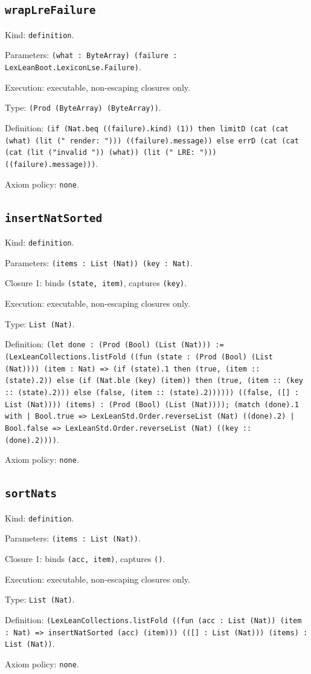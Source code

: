\documentclass[11pt]{article}
\begin{document}
\subsection*{\texttt{wrapLreFailure}}
\noindent Kind: \texttt{definition}.\par
\noindent Parameters: \texttt{(what : ByteArray) (failure : LexLeanBoot.LexiconLse.Failure)}.\par
\noindent Execution: executable, non-escaping closures only.\par
\noindent Type: \texttt{(Prod (ByteArray) (ByteArray))}.\par
\noindent Definition: \texttt{(if (Nat.beq ((failure).kind) (1)) then limitD (cat (cat (what) (lit (" render: "))) ((failure).message)) else errD (cat (cat (cat (lit ("invalid ")) (what)) (lit (" LRE: "))) ((failure).message)))}.\par
\noindent Axiom policy: \texttt{none}.\par
\subsection*{\texttt{insertNatSorted}}
\noindent Kind: \texttt{definition}.\par
\noindent Parameters: \texttt{(items : List (Nat)) (key : Nat)}.\par
\noindent Closure 1: binds \texttt{(state, item)}, captures \texttt{(key)}.\par
\noindent Execution: executable, non-escaping closures only.\par
\noindent Type: \texttt{List (Nat)}.\par
\noindent Definition: \texttt{(let done : (Prod (Bool) (List (Nat))) := (LexLeanCollections.listFold ((fun (state : (Prod (Bool) (List (Nat)))) (item : Nat) => (if (state).1 then (true, (item :: (state).2)) else (if (Nat.ble (key) (item)) then (true, (item :: (key :: (state).2))) else (false, (item :: (state).2)))))) ((false, ([] : List (Nat)))) (items) : (Prod (Bool) (List (Nat)))); (match (done).1 with | Bool.true => LexLeanStd.Order.reverseList (Nat) ((done).2) | Bool.false => LexLeanStd.Order.reverseList (Nat) ((key :: (done).2))))}.\par
\noindent Axiom policy: \texttt{none}.\par
\subsection*{\texttt{sortNats}}
\noindent Kind: \texttt{definition}.\par
\noindent Parameters: \texttt{(items : List (Nat))}.\par
\noindent Closure 1: binds \texttt{(acc, item)}, captures \texttt{()}.\par
\noindent Execution: executable, non-escaping closures only.\par
\noindent Type: \texttt{List (Nat)}.\par
\noindent Definition: \texttt{(LexLeanCollections.listFold ((fun (acc : List (Nat)) (item : Nat) => insertNatSorted (acc) (item))) (([] : List (Nat))) (items) : List (Nat))}.\par
\noindent Axiom policy: \texttt{none}.\par
\end{document}
